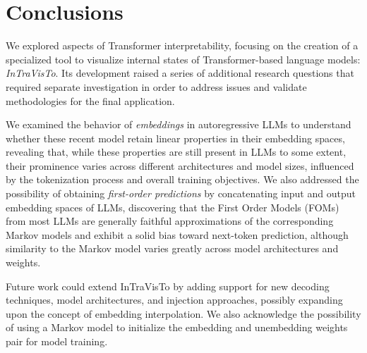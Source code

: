 \documentclass[11pt,a4paper,twocolumn]{article}
\begin{document}
\section{Conclusions}\label{sec:conclusions}

We explored aspects of Transformer interpretability, focusing on the creation of a specialized tool to visualize internal states of Transformer-based language models: \emph{InTraVisTo}.
Its development raised a series of additional research questions that required separate investigation in order to address issues and validate methodologies for the final application.

We examined the behavior of \emph{embeddings} in autoregressive LLMs to understand whether these recent model retain linear properties in their embedding spaces, revealing that, while these properties are still present in LLMs to some extent, their prominence varies across different architectures and model sizes, influenced by the tokenization process and overall training objectives.
We also addressed the possibility of obtaining \emph{first-order predictions} by concatenating input and output embedding spaces of LLMs, discovering that the First Order Models (FOMs) from most LLMs are generally faithful approximations of the corresponding Markov models and exhibit a solid bias toward next-token prediction, although similarity to the Markov model varies greatly across model architectures and weights.

Future work could extend InTraVisTo by adding support for new decoding techniques, model architectures, and injection approaches, possibly expanding upon the concept of embedding interpolation.
We also acknowledge the possibility of using a Markov model to initialize the embedding and unembedding weights pair for model training.

\end{document}
